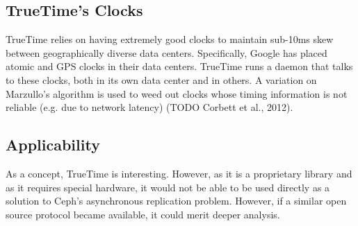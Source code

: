 \subsection{TrueTime's Clocks}

TrueTime relies on having extremely good clocks to maintain sub-10ms
skew between geographically diverse data centers. Specifically, Google
has placed atomic and GPS clocks in their data centers. TrueTime runs
a daemon that talks to these clocks, both in its own data center and
in others. A variation on Marzullo’s algorithm is used to weed out
clocks whose timing information is not reliable (e.g. due to network
latency) (TODO Corbett et al., 2012).

\subsection{Applicability}

As a concept, TrueTime is interesting. However, as it is a proprietary
library and as it requires special hardware, it would not be able to
be used directly as a solution to Ceph’s asynchronous replication
problem. However, if a similar open source protocol became available,
it could merit deeper analysis. %
